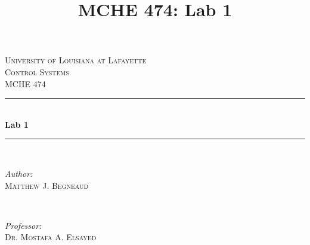 \documentclass[12pt]{article}
\title{MCHE 474: Lab 1}
\begin{document}




\begin{titlepage}

\newcommand{\HRule}{\rule{\linewidth}{0.5mm}} %

\center %
 

\textsc{\LARGE University of Louisiana at Lafayette}\\[1.5cm] %
\textsc{\Large Control Systems}\\[0.5cm] %
\textsc{\large MCHE 474}\\[0.5cm] %


\HRule \\[0.4cm]
{ \huge \bfseries Lab 1}\\[0.4cm] %
\HRule \\[1.5cm]
 

\begin{minipage}{0.4\textwidth}
\begin{flushleft} \large
\emph{Author:}\\
\textsc{Matthew J. Begneaud} \\%
\end{flushleft}
\end{minipage}
~
\begin{minipage}{0.4\textwidth}
\begin{flushright} \large
\emph{Professor:} \\
\textsc{Dr. Mostafa A. Elsayed} %
\end{flushright}
\end{minipage}\\[1.5cm]


\end{titlepage}
\end{document}

